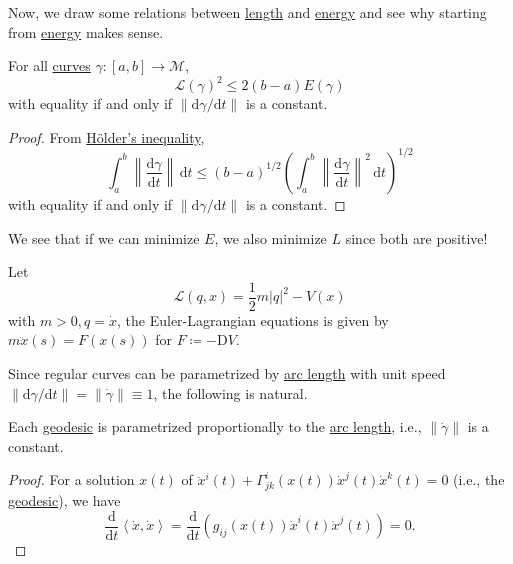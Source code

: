 Now, we draw some relations between \hyperref[def:length]{length} and \hyperref[def:energy]{energy} and see why starting from \hyperref[def:energy]{energy} makes sense.

\begin{proposition}
	For all \hyperref[def:curve]{curves} \(\gamma \colon [a, b] \to \mathcal{M} \),
	\[
		\mathcal{L} (\gamma )^2 \leq 2(b-a) E(\gamma )
	\]
	with equality if and only if \(\lVert \mathrm{d} \gamma / \mathrm{d} t \rVert \) is a constant.
\end{proposition}
\begin{proof}
	From \href{https://en.wikipedia.org/wiki/H%C3%B6lder%27s_inequality}{Hölder's inequality},
	\[
		\int_{a}^{b} \left\lVert \frac{\mathrm{d}\gamma }{\mathrm{d}t} \right\rVert \,\mathrm{d}t
		\leq (b-a)^{1 / 2} \left( \int_{a}^{b} \left\lVert \frac{\mathrm{d}\gamma }{\mathrm{d}t} \right\rVert ^2 \,\mathrm{d}t \right) ^{1 / 2}
	\]
	with equality if and only if \(\lVert \mathrm{d} \gamma / \mathrm{d} t \rVert\) is a constant.
\end{proof}

\begin{intuition}
	We see that if we can minimize \(E\), we also minimize \(L\) since both are positive!
\end{intuition}

\begin{eg}
	Let
	\[
		\mathcal{L} (q, x) = \frac{1}{2} m \vert q \vert ^2 - V(x)
	\]
	with \(m > 0, q = \dot{x}\), the Euler-Lagrangian equations is given by \(m\ddot{x} (s) = F(x(s))\) for \(F\coloneqq -\mathrm{D} V\).
\end{eg}

Since regular curves can be parametrized by \hyperref[def:length]{arc length} with unit speed \(\lVert \mathrm{d} \gamma / \mathrm{d} t \rVert = \lVert \dot{\gamma } \rVert \equiv 1\), the following is natural.

\begin{lemma}
	Each \hyperref[def:geodesic]{geodesic} is parametrized proportionally to the \hyperref[def:length]{arc length}, i.e., \(\lVert \dot{\gamma } \rVert \) is a constant.
\end{lemma}
\begin{proof}
	For a solution \(x(t)\) of \(\ddot{x}^i(t) + \Gamma ^{i}_{jk}(x(t)) \dot{x}^j(t)\dot{x}^k(t) = 0\) (i.e., the \hyperref[def:geodesic]{geodesic}), we have
	\[
		\frac{\mathrm{d}}{\mathrm{d}t} \left\langle \dot{x}, \dot{x} \right\rangle
		= \frac{\mathrm{d}}{\mathrm{d}t} \left( g_{ij} (x(t)) \dot{x}^i(t)\dot{x}^j(t)\right)
		=0.
	\]
\end{proof}

